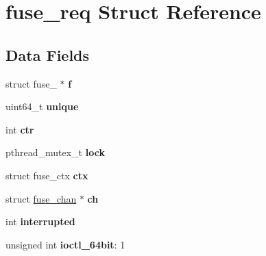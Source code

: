 \hypertarget{structfuse__req}{}\section{fuse\+\_\+req Struct Reference}
\label{structfuse__req}
\subsection*{Data Fields}
\begin{DoxyCompactItemize}
\item 
struct fuse\+\_ $\ast$ {\bfseries f}\hypertarget{structfuse__req_af610e0d4ec1a72774b9bfdbe2cc2a38d}{}\label{structfuse__req_af610e0d4ec1a72774b9bfdbe2cc2a38d}

\item 
uint64\+\_\+t {\bfseries unique}\hypertarget{structfuse__req_a6e770f087e6658ef8cf81c87fb7a1a72}{}\label{structfuse__req_a6e770f087e6658ef8cf81c87fb7a1a72}

\item 
int {\bfseries ctr}\hypertarget{structfuse__req_a6ba145c1ba021377ba8943252e843873}{}\label{structfuse__req_a6ba145c1ba021377ba8943252e843873}

\item 
pthread\+\_\+mutex\+\_\+t {\bfseries lock}\hypertarget{structfuse__req_a9e9a837627fa02b6d657ebdb0477019f}{}\label{structfuse__req_a9e9a837627fa02b6d657ebdb0477019f}

\item 
struct fuse\+\_\+ctx {\bfseries ctx}\hypertarget{structfuse__req_aa69ca380f2f88502a9137c3a4389e8e7}{}\label{structfuse__req_aa69ca380f2f88502a9137c3a4389e8e7}

\item 
struct \hyperlink{structfuse__chan}{fuse\+\_\+chan} $\ast$ {\bfseries ch}\hypertarget{structfuse__req_acfb22dc0ec65411832760177ddd952f6}{}\label{structfuse__req_acfb22dc0ec65411832760177ddd952f6}

\item 
int {\bfseries interrupted}\hypertarget{structfuse__req_a35ac21d110d4eadc640b9873f347d325}{}\label{structfuse__req_a35ac21d110d4eadc640b9873f347d325}

\item 
unsigned int {\bfseries ioctl\+\_\+64bit}\+: 1\hypertarget{structfuse__req_a4a7928cfab4288420cdd253c7fde30c8}{}\label{structfuse__req_a4a7928cfab4288420cdd253c7fde30c8}


\end{DoxyCompactItemize}

